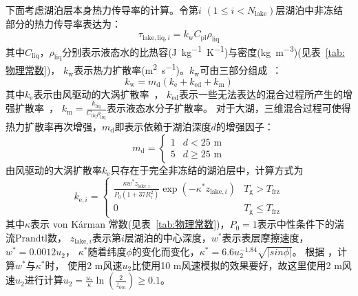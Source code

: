 下面考虑湖泊层本身热力传导率的计算。令第$i$ $\left(1\leqslant i<N_{\mathrm{lake}}\right)$层湖泊中非冻结部分的热力传导率表达为：
\begin{equation}
  \tau_{\mathrm{lake,liq},i}=k_{\mathrm{w}} C_{\mathrm{p l}} \rho_{\mathrm{liq}}
\end{equation}
其中$C_{\mathrm{liq}}$，$\rho_{\mathrm{liq}}$分别表示液态水的比热容(\unit{J.kg^{-1}.K^{-1}})与密度(\unit{kg.m^{-3}})(见表~\ref{tab:物理常数})，
$k_{\mathrm {w}} $表示热力扩散率(\unit{m^2.s^{-1}})。$k_{\mathrm {w}} $可由三部分组成~\citep{subin2012improved}：
\begin{equation}
  k_{\mathrm{w}}=m_{\mathrm{d}}\left(k_{\mathrm{e}}+k_{\mathrm{ed}}+k_{\mathrm{m}}\right)
\end{equation}
其中$k_{\mathrm {e}} $表示由风驱动的大涡扩散率~\citep{hostetler1990simulation}，
$k_{\mathrm{ed}}$表示一些无法表达的混合过程所产生的增强扩散率~\citep{fang1996long}，
$k_{\mathrm {m}} =\frac{k_{\mathrm {liq}}}{C_{\mathrm{liq}}\rho_{\mathrm{liq}}}$表示液态水分子扩散率。
对于大湖，三维混合过程可使得热力扩散率再次增强，$m_{\mathrm {d}} $即表示依赖于湖泊深度$d$的增强因子：
\begin{equation}
  m_{\mathrm{d}}=\left\{\begin{array}{ll}1 & d<25 \text{ m} \\ 5 & d \geqslant 25 \text{ m}\end{array}\right.
\end{equation}
由风驱动的大涡扩散率$k_{\mathrm {e}} $只存在于完全非冻结的湖泊层中，计算方式为
\begin{equation}
  k_{\mathrm{e},i}=\begin{cases}
    \frac{\kappa w^\ast z_{\mathrm{lake},i}}{P_{0}\left(1+37 R_{i}^{2}\right)}
    \exp \left(-\kappa^{*} z_{\mathrm{lake},i}\right) & T_{\mathrm{g}}>T_{\mathrm {frz}} \\
    0 & T_{\mathrm{g}} \leqslant T_{\mathrm {frz}}
  \end{cases}
\end{equation}
其中$\kappa$表示 von K\'arman 常数(见表~\ref{tab:物理常数})，$P_0=1$表示中性条件下的湍流${\mathrm {Prandtl}}$数，
$z_{\mathrm{lake},i}$表示第$i$层湖泊的中心深度，$w^\ast$表示表层摩擦速度，$w^\ast=0.0012u_2$，
$\kappa^\ast$随着纬度$\phi$的变化而变化，$\kappa^\ast=6.6u_2^{-1.84}\sqrt{\left|sin\phi\right|}$。
根据 \citet{hostetler1990simulation}，计算$w^\ast$与$\kappa^\ast$时，
使用2 m风速$u_2$比使用10 m风速模拟的效果要好，故这里使用2 m风速$u_2$进行计算$u_2=\frac{u_\ast}{\kappa}\ln{\left(\frac{2}{z_{0m}}\right)}\geqslant 0.1$。

